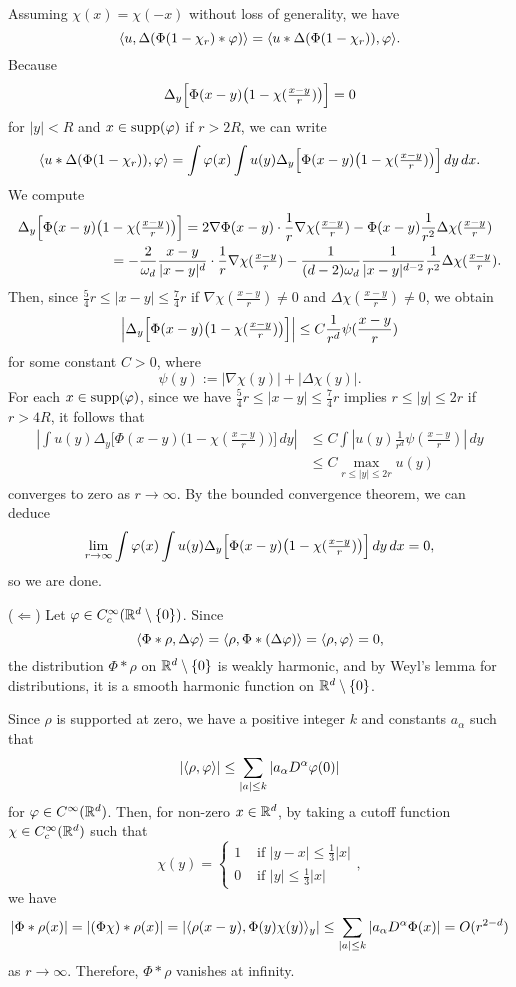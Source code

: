\documentclass[12pt]{article}
\begin{document}
\begin{pf}
Assuming $\chi(x)=\chi(-x)$ without loss of generality, we have
\[\langle u,\Delta(\Phi(1-\chi_r)*\varphi)\rangle=\langle u*\Delta(\Phi(1-\chi_r)),\varphi\rangle.\]
Because
\[\Delta_y\Bigl[\Phi(x-y)\bigl(1-\chi(\tfrac{x-y}r)\bigr)\Bigr]=0\]
for $|y|<R$ and $x\in\operatorname{supp}(\varphi)$ if $r>2R$, we can write
\[\langle u*\Delta(\Phi(1-\chi_r)),\varphi\rangle
=\int\varphi(x)\int u(y)\Delta_y\Bigl[\Phi(x-y)\bigl(1-\chi(\tfrac{x-y}r)\bigr)\Bigr]\,dy\,dx.\]
We compute
\begin{align*}
\Delta_y\Bigl[\Phi(x-y)\bigl(1&-\chi(\tfrac{x-y}r)\bigr)\Bigr]
=2\nabla\Phi(x-y)\cdot\frac1r\nabla\chi(\tfrac{x-y}r)-\Phi(x-y)\frac1{r^2}\Delta\chi(\tfrac{x-y}r)\\
&=-\frac2{\omega_d}\frac{x-y}{|x-y|^d}\cdot\frac1r\nabla\chi(\tfrac{x-y}r)
-\frac1{(d-2)\omega_d}\frac1{|x-y|^{d-2}}\frac1{r^2}\Delta\chi(\tfrac{x-y}r).
\end{align*}
Then, since $\frac54r\le|x-y|\le\frac74r$ if $\nabla\chi(\tfrac{x-y}r)\ne0$ and $\Delta\chi(\tfrac{x-y}r)\ne0$, we obtain
\[\Bigl|\Delta_y\Bigl[\Phi(x-y)\bigl(1-\chi(\tfrac{x-y}r)\bigr)\Bigr]\Bigr|\le C\frac1{r^d}\psi(\frac{x-y}r)\]
for some constant $C>0$, where
\[\psi(y):=|\nabla\chi(y)|+|\Delta\chi(y)|.\]
For each $x\in\operatorname{supp}(\varphi)$, since we have $\frac54r\le|x-y|\le\frac74r$ implies $r\le|y|\le2r$ if $r>4R$, it follows that
\begin{align*}
|\int u(y)\Delta_y\bigl[\Phi(x-y)\bigl(1-\chi(\tfrac{x-y}r)\bigr)\bigr]\,dy|
&\le C\int|u(y)\frac1{r^d}\psi(\frac{x-y}r)|\,dy\\
&\le C\max_{r\le|y|\le2r}u(y)
\end{align*}
converges to zero as $r\to\infty$.
By the bounded convergence theorem, we can deduce
\[\lim_{r\to\infty}\int\varphi(x)\int u(y)\Delta_y\Bigl[\Phi(x-y)\bigl(1-\chi(\tfrac{x-y}r)\bigr)\Bigr]\,dy\,dx=0,\]
so we are done.

($\Leftarrow$)
Let $\varphi\in C_c^\infty(\mathbb{R}^d\setminus\{0\})$.
Since
\[\langle\Phi*\rho,\Delta\varphi\rangle=\langle\rho,\Phi*(\Delta\varphi)\rangle=\langle\rho,\varphi\rangle=0,\]
the distribution $\Phi*\rho$ on $\mathbb{R}^d\setminus\{0\}$ is weakly harmonic, and by Weyl's lemma for distributions, it is a smooth harmonic function on $\mathbb{R}^d\setminus\{0\}$.

Since $\rho$ is supported at zero, we have a positive integer $k$ and constants $a_\alpha$ such that
\[|\langle\rho,\varphi\rangle|\le\sum_{|a|\le k}|a_\alpha D^\alpha\varphi(0)|\]
for $\varphi\in C^\infty(\mathbb{R}^d)$.
Then, for non-zero $x\in\mathbb{R}^d$, by taking a cutoff function $\chi\in C_c^\infty(\mathbb{R}^d)$ such that
\[\chi(y)=\begin{cases}1&\text{ if }|y-x|\le\frac13|x|\\0&\text{ if }|y|\le\frac13|x|\end{cases},\]
we have
\[|\Phi*\rho(x)|=|(\Phi\chi)*\rho(x)|=|\langle\rho(x-y),\Phi(y)\chi(y)\rangle_y|\le\sum_{|a|\le k}|a_\alpha D^\alpha\Phi(x)|=O(r^{2-d})\]
as $r\to\infty$.
Therefore, $\Phi*\rho$ vanishes at infinity.
\end{pf}
\end{document}
